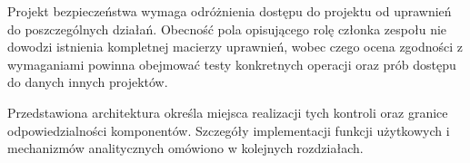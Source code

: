 Projekt bezpieczeństwa wymaga odróżnienia dostępu do projektu od uprawnień do poszczególnych działań. Obecność pola opisującego rolę członka zespołu nie dowodzi istnienia kompletnej macierzy uprawnień, wobec czego ocena zgodności z wymaganiami powinna obejmować testy konkretnych operacji oraz prób dostępu do danych innych projektów.

Przedstawiona architektura określa miejsca realizacji tych kontroli oraz granice odpowiedzialności komponentów. Szczegóły implementacji funkcji użytkowych i mechanizmów analitycznych omówiono w kolejnych rozdziałach.